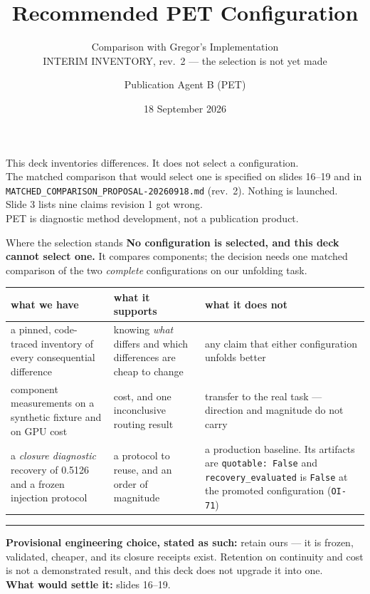 \documentclass[aspectratio=169,10pt]{beamer}
\title{Recommended PET Configuration}
\subtitle{Comparison with Gregor's Implementation\\[0.3em]
\normalsize INTERIM INVENTORY, rev.\ 2 --- the selection is not yet made}
\author{Publication Agent B (PET)}
\date{18 September 2026}
\newcommand{\warn}[1]{\textcolor{warn}{#1}}
\begin{document}
\begin{frame}
  \titlepage
  \begin{center}
    \small
    \warn{This deck inventories differences. It does not select a configuration.}\\
    \small The matched comparison that would select one is specified on slides 16--19 and in\\
    \texttt{MATCHED\_COMPARISON\_PROPOSAL-20260918.md} (rev.\ 2). Nothing is launched.\\[0.4em]
    \small \warn{Slide 3 lists nine claims revision 1 got wrong.}\\[0.4em]
    \warn{PET is diagnostic method development, not a publication product.}
  \end{center}
\end{frame}

\begin{frame}{Where the selection stands}
  \textbf{No configuration is selected, and this deck cannot select one.} It compares
  components; the decision needs one matched comparison of the two \emph{complete}
  configurations on our unfolding task.
  \vspace{0.5em}

  \begin{center}\footnotesize
  \begin{tabular}{@{}R{0.26\textwidth}R{0.34\textwidth}R{0.33\textwidth}@{}}
    \toprule
    \textbf{what we have} & \textbf{what it supports} & \textbf{what it does not} \\
    \midrule
    a pinned, code-traced inventory of every consequential difference &
      knowing \emph{what} differs and which differences are cheap to change &
      \warn{any claim that either configuration unfolds better} \\
    component measurements on a synthetic fixture and on GPU cost &
      cost, and one inconclusive routing result &
      \warn{transfer to the real task --- direction and magnitude do not carry} \\
    a \emph{closure diagnostic} recovery of 0.5126 and a frozen injection protocol &
      a protocol to reuse, and an order of magnitude &
      \warn{a production baseline. Its artifacts are \texttt{quotable: False} and
      \texttt{recovery\_evaluated} is \texttt{False} at the promoted configuration
      (\texttt{OI-71})} \\
    \bottomrule
  \end{tabular}
  \end{center}
  \vspace{0.5em}
  \hrule
  \vspace{0.4em}
  {\small
  \textbf{Provisional engineering choice, stated as such:} retain ours --- it is frozen,
  validated, cheaper, and its closure receipts exist. \warn{Retention on continuity and
  cost is not a demonstrated result, and this deck does not upgrade it into one.}
  \\[0.3em]
  \textbf{What would settle it:} slides 16--19.}
\end{frame}
\end{document}
